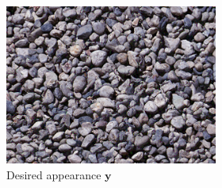 \begin{figure}[]
\begin{subfigure}{\textwidth}
        \begin{subfigure}{0.2\textwidth}
            \centering
            \includegraphics[width=\textwidth]{images/04-experiment02/carpet/pebbles/target.jpg}
            \caption*{Desired appearance \(\bm{y}\)}
        \end{subfigure}
        \hfill
        \begin{subfigure}{0.78\textwidth}
            \centering
            \begin{subfigure}{0.32\textwidth}
                \centering
\end{subfigure}
\end{subfigure}
\end{subfigure}
\end{figure}
